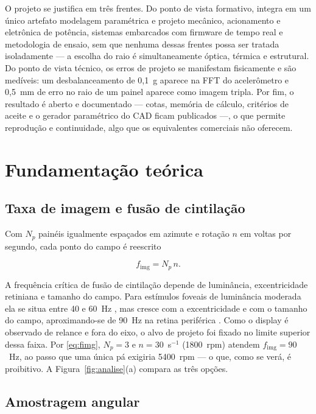 \documentclass[10pt,a4paper,twocolumn]{article}
\begin{document}
O projeto se justifica em três frentes. Do ponto de vista formativo, integra em
um único artefato modelagem paramétrica e projeto mecânico, acionamento e
eletrônica de potência, sistemas embarcados com firmware de tempo real e
metodologia de ensaio, sem que nenhuma dessas frentes possa ser tratada
isoladamente --- a escolha do raio é simultaneamente óptica, térmica e
estrutural. Do ponto de vista técnico, os erros de projeto se manifestam
fisicamente e são medíveis: um desbalanceamento de 0,1~g aparece na FFT do
acelerômetro e 0,5~mm de erro no raio de um painel aparece como imagem tripla.
Por fim, o resultado é aberto e documentado --- cotas, memória de cálculo,
critérios de aceite e o gerador paramétrico do CAD ficam publicados ---, o que
permite reprodução e continuidade, algo que os equivalentes comerciais não
oferecem.

\section{Fundamentação teórica}
\label{sec:teoria}

\subsection{Taxa de imagem e fusão de cintilação}

Com $N_p$ painéis igualmente espaçados em azimute e rotação $n$ em voltas por
segundo, cada ponto do campo é reescrito

\begin{equation}
f_{\mathrm{img}} = N_p \, n .
\label{eq:fimg}
\end{equation}

A frequência crítica de fusão de cintilação depende de luminância,
excentricidade retiniana e tamanho do campo. Para estímulos foveais de
luminância moderada ela se situa entre 40 e 60~Hz \cite{kelly1961}, mas cresce
com a excentricidade e com o tamanho do campo, aproximando-se de 90~Hz na
retina periférica \cite{tyler1985}. Como o display é observado de relance e
fora do eixo, o alvo de projeto foi fixado no limite superior dessa faixa. Por
\eqref{eq:fimg}, $N_p=3$ e $n=30$~s$^{-1}$ (1800~rpm) atendem
$f_{\mathrm{img}}=90$~Hz, ao passo que uma única pá exigiria 5400~rpm --- o que,
como se verá, é proibitivo. A Figura~\ref{fig:analise}(a) compara as três
opções.

\subsection{Amostragem angular}
\end{document}
